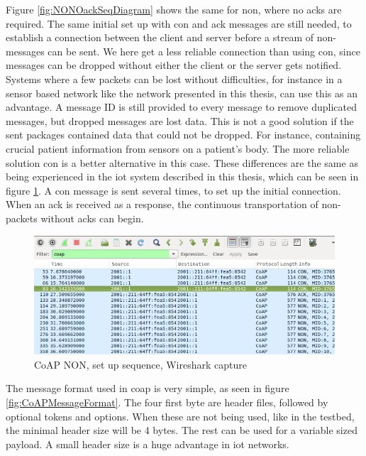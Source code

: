 \noindent Figure \ref{fig:NONOackSeqDiagram} shows the same for \gls{non}, where no \glspl{ack} are required. The same initial set up with \gls{con} and \gls{ack} messages are still needed, to establish a connection between the client and server before a stream of \gls{non}-messages can be sent. We here get a less reliable connection than using \gls{con}, since messages can be dropped without either the client or the server gets notified. Systems where a few packets can be lost without difficulties, for instance in a sensor based network like the network presented in this thesis, can use this as an advantage. A message ID is still provided to every message to remove duplicated messages, but dropped messages are lost data.  This is not a good solution if the sent packages contained data that could not be dropped. For instance, containing crucial patient information from sensors on a patient's body. The more reliable solution \gls{con} is a better alternative in this case. These differences are the same as being experienced in the \gls{iot} system described in this thesis, which can be seen in figure \ref{fig:CoAPNONwiresharkSetUp}. A \gls{con} message is sent several times, to set up the initial connection. When an \gls{ack} is received as a response, the continuous transportation of \gls{non}-packets without \glspl{ack} can begin. %

\begin{figure}[ht]
    \centering
    \includegraphics[width=1.0\textwidth]{coapCONwiresharksetUpSequence.png}    
    \caption{CoAP NON, set up sequence, Wireshark capture}
    \label{fig:CoAPNONwiresharkSetUp}
\end{figure}


\noindent The message format used in \gls{coap} is very simple, as seen in figure \ref{fig:CoAPMessageFormat}. The four first byte are header files, followed by optional tokens and options. When these are not being used, like in the testbed, the minimal header size will be 4 bytes\cite{shelby2014constrained}. The rest can be used for a variable sized \gls{payload}. A small header size is a huge advantage in \gls{iot} networks.

